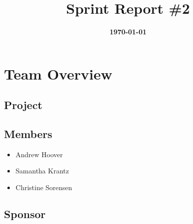\documentclass{article}
\title{\normalfont\Large\bfseries\color{TitleColor}Sprint Report \#2}
\date{\normalfont\bfseries\color{TitleColor}\today}
\begin{document}
\maketitle

\section*{Team Overview}
\subsection*{Project}

\subsection*{Members}
\begin{itemize}
	\item Andrew Hoover
	\item Samantha Krantz
	\item Christine Sorensen
\end{itemize}

\subsection*{Sponsor}
\end{document}
